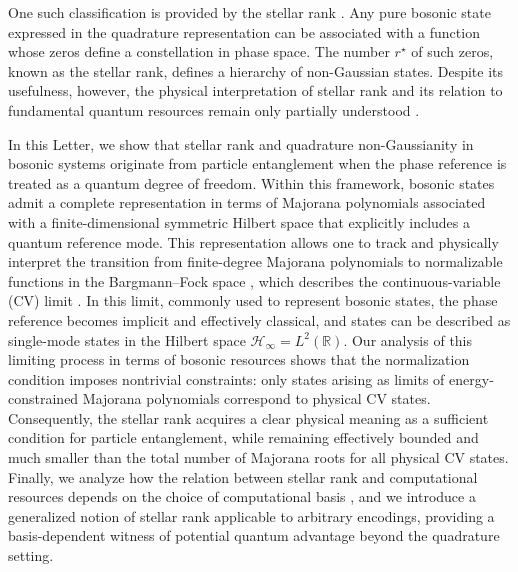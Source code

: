 \documentclass[aps,prl,showpacs,twocolumn]{revtex4-2}
\begin{document}
One such classification is provided by the stellar rank \cite{Stellar}. Any pure bosonic state expressed in the quadrature representation can be associated with a function whose zeros define a constellation in phase space. The number $r^{\star}$
 of such zeros, known as the stellar rank, defines a hierarchy of non-Gaussian states. Despite its usefulness, however, the physical interpretation of stellar rank and its relation to fundamental quantum resources remain only partially understood \cite{PhysRevLett.130.090602, provaznik2026,Fiurasek:22,PRXQuantum.2.020333}.







In this Letter, we show that stellar rank and quadrature non-Gaussianity in bosonic systems originate from particle entanglement when the phase reference is treated as a quantum degree of freedom. Within this framework, bosonic states admit a complete representation in terms of Majorana polynomials associated with a finite-dimensional symmetric Hilbert space that explicitly includes a quantum reference mode. This representation allows one to track and physically interpret the transition from finite-degree Majorana polynomials to normalizable functions in the Bargmann–Fock space \cite{Bargmann1961,Segal1963Relativistic}, which describes the continuous-variable (CV) limit \cite{PhysRevA.63.012102,Ricci1986}. In this limit, commonly used to represent bosonic states, the phase reference becomes implicit and effectively classical, and states can be described as single-mode states in the Hilbert space $\mathcal{H}_{\infty}=L^2(\mathbb{R})$. Our analysis of this limiting process in terms of bosonic resources shows that the normalization condition imposes nontrivial constraints: only states arising as limits of energy-constrained Majorana polynomials correspond to physical CV states. Consequently, the stellar rank acquires a clear physical meaning as a sufficient condition for particle entanglement, while remaining effectively bounded and much smaller than the total number of Majorana roots for all physical CV states. Finally, we analyze how the relation between stellar rank and computational resources depends on the choice of computational basis \cite{descamps2025HW}, and we introduce a generalized notion of stellar rank applicable to arbitrary encodings, providing a basis-dependent witness of potential quantum advantage beyond the quadrature setting.
\end{document}

